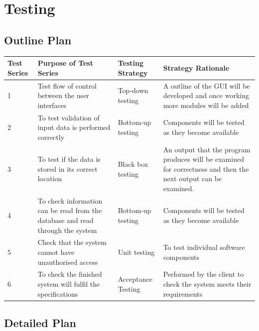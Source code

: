 \section{Testing}

\begin{landscape}
\subsection{Outline Plan}

\begin{center}
    \begin{tabular}{|p{2cm}|p{5cm}|p{5cm}|p{4cm}|}
        \hline
        \textbf{Test Series} & \textbf{Purpose of Test Series} & \textbf{Testing Strategy} & \textbf{Strategy Rationale}\\ \hline
1 & Test flow of control between the user interfaces & Top-down testing & A outline of the GUI will be developed and once working more modules will be added \\ \hline
       2 & To test validation of input data is performed correctly & Bottom-up testing & Components will be tested as they become available \\ \hline
3 & To test if the data is stored in its correct location & Black box testing & An output that the program produces will be examined for correctness and then the next output can be examined.\\ \hline
4 & To check information can be read from the database and read through the system & Bottom-up testing &  Components will be tested as they become available\\ \hline
5 & Check that the system cannot have unauthorised access & Unit testing & To test individual software components \\ \hline
6 & To check the finished system will fulfil the specifications &  Acceptance Testing & Performed by the client to check the system meets their requirements\\ \hline

    \end{tabular}
\end{center}

\subsection{Detailed Plan}


\end{landscape}
